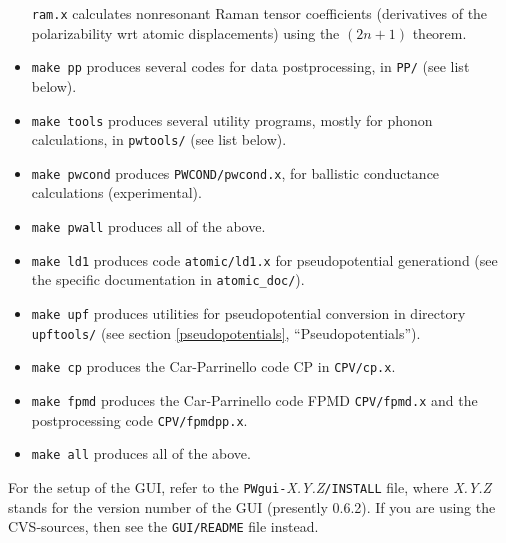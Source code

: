 \documentclass[12pt,a4paper]{article}
\begin{document}
\begin{itemize}
    \texttt{ram.x} calculates nonresonant Raman tensor coefficients
    (derivatives of the polarizability wrt atomic displacements)
    using the $(2n+1)$ theorem.
  \item
    \texttt{make pp} produces several codes for data postprocessing, in
    \texttt{PP/} (see list below).
  \item
    \texttt{make tools} produces several utility programs, mostly for
    phonon calculations, in \texttt{pwtools/} (see list below).
  \item
    \texttt{make pwcond} produces \texttt{PWCOND/pwcond.x}, for
    ballistic conductance calculations (experimental).
  \item
    \texttt{make pwall} produces all of the above.
  \item
    \texttt{make ld1} produces code \texttt{atomic/ld1.x} for 
    pseudopotential generationd (see the specific
    documentation in \texttt{atomic\_doc/}).
  \item
    \texttt{make upf} produces utilities for pseudopotential
    conversion in directory \texttt{upftools/} (see section
    \ref{pseudopotentials}, ``Pseudopotentials'').
  \item
    \texttt{make cp} produces the Car-Parrinello code CP in
    \texttt{CPV/cp.x}.
  \item
    \texttt{make fpmd} produces the Car-Parrinello code FPMD
    \texttt{CPV/fpmd.x} and the postprocessing code 
    \texttt{CPV/fpmdpp.x}.
  \item
    \texttt{make all} produces all of the above.
\end{itemize}
For the setup of the GUI, refer to the
\texttt{PWgui-}\emph{X.Y.Z}\texttt{/INSTALL} file, where \emph{X.Y.Z}
stands for the version number of the GUI (presently 0.6.2).
If you are using the CVS-sources, then see the \texttt{GUI/README}
file instead.
\end{document}

